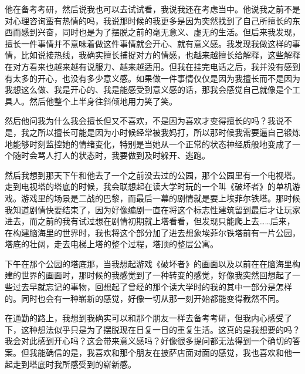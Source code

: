 他在备考考研，然后说我也可以去试试看，我说我还在考虑当中。他说我之前不是对心理咨询蛮有热情的吗，我说那时候的我更多是因为突然找到了自己所擅长的东西而感到兴奋，同时也是为了摆脱之前的毫无意义、虚无的生活。但后来我发现，擅长一件事情并不意味着做这件事情就会开心、就有意义感。我发现我做这样的事情，比如说接热线，我确实擅长捕捉对方的情感，也越来越擅长给解释，这些解释在对方看来也越来越有说服力、越来越适用。但我在挂完电话之后，我并没有感到有太多的开心，也没有多少意义感。如果做一件事情仅仅是因为我擅长而不是因为我想这么做、我是开心的、我是能感受到意义感的话，那我会感觉自己就像是个工具人。然后他整个上半身往斜倾地用力笑了笑。

然后他问我为什么我会擅长但又不喜欢，不是因为喜欢才变得擅长的吗？我说不是，我之所以擅长可能是因为小时候经常被我妈打，所以那时候我需要逼自己锻炼地能够时刻监控她的情绪变化，特别是当她从一个正常的状态神经质般地变成了一个随时会骂人打人的状态时，我要做到及时躲开、逃跑。

然后我想到那天下午和他去了一个之前没去过的公园，那个公园里有一个电视塔。走到电视塔的塔底的时候，我会联想起在读大学时玩的一个叫《破坏者》的单机游戏。游戏里的场景是二战的巴黎，而最后一幕的剧情就是要上埃菲尔铁塔。那时候我知道剧情快要结束了，因为好像编剧一直在将这个标志性建筑留到最后才让玩家进去，而之前的我有试过想在剧情初期就上塔看看，但发现只能爬上去……后来，在构建脑海里的世界时，我也将这个部分加了进去\pozhehao{}想象埃菲尔铁塔前有一片公园，塔底的壮阔，走去电梯上塔的整个过程，塔顶的整层公寓。

下午在那个公园的塔底那，当我想起游戏《破坏者》的画面以及以前在在脑海里构建的世界的画面时，那时候的我感觉到了一种转变的感觉，好像我突然回想起了一些过去早就忘记的事物，回想起了曾经的那个读大学时的我的其中一部分是怎样的。同时也会有一种崭新的感觉，好像一切从那一刻开始都能变得截然不同。

在通勤的路上，我想到我确实可以和那个朋友一样去备考考研，但我内心感受了下，这种想法似乎只是为了摆脱现在日复一日的重复生活。这真的是我想要的吗？我会对此感到开心吗？这会带来意义感吗？好像很多提问都无法得到一个确切的答案。但我能确信的是，我喜欢和那个朋友在披萨店面对面的感觉，我也喜欢和他一起走到塔底时我所感受到的崭新感。



